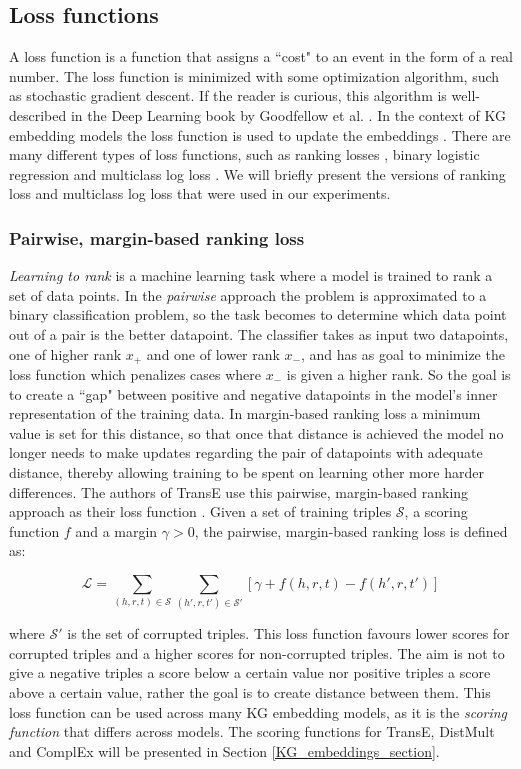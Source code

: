 \subsection{Loss functions}
A loss function is a function that assigns a ``cost" to an event in the form of a real number. The loss function is minimized with some optimization algorithm, such as stochastic gradient descent. If the reader is curious, this algorithm is well-described in the Deep Learning book by Goodfellow et al. \cite[p. 149]{goodfellow}. In the context of KG embedding models the loss function is used to update the embeddings \cite{dai2020survey}. There are many different types of loss functions, such as ranking losses \cite{TransE}, binary logistic regression \cite{complEx} and multiclass log loss \cite{kadlec2017knowledge}. We will briefly present the versions of ranking loss and multiclass log loss that were used in our experiments.

\subsubsection{Pairwise, margin-based ranking loss}
\textit{Learning to rank} is a machine learning task where a model is trained to rank a set of data points. In the \textit{pairwise} approach the problem is approximated to a binary classification problem, so the task becomes to determine which data point out of a pair is the better datapoint. The classifier takes as input two datapoints, one of higher rank $x_{+}$ and one of lower rank $x_{-}$, and has as goal to minimize the loss function which penalizes cases where $x_{-}$ is given a higher rank. So the goal is to create a ``gap" between positive and negative datapoints in the model's inner representation of the training data. In margin-based ranking loss a minimum value is set for this distance, so that once that distance is achieved the model no longer needs to make updates regarding the pair of datapoints with adequate distance, thereby allowing training to be spent on learning other more harder differences.  The authors of TransE use this pairwise, margin-based ranking approach as their loss function \cite{TransE}. Given a set of training triples $\mathcal{S}$, a scoring function $f$ and a margin $\gamma > 0$, the pairwise, margin-based ranking loss is defined as:

\[\mathcal{L}=\sum_{(h, r, t) \in \mathcal{S}}\sum_{(h', r, t') \in \mathcal{S'}}[\gamma + f(h, r, t) - f(h', r, t')]\]

where $\mathcal{S'}$ is the set of corrupted triples. This loss function favours lower scores for corrupted triples and a higher scores for non-corrupted triples. The aim is not to give a negative triples a score below a certain value nor positive triples a score above a certain value, rather the goal is to create distance between them. This loss function can be used across many KG embedding models, as it is the \textit{scoring function} that differs across models. The scoring functions for TransE, DistMult and ComplEx will be presented in Section \ref{KG_embeddings_section}.


